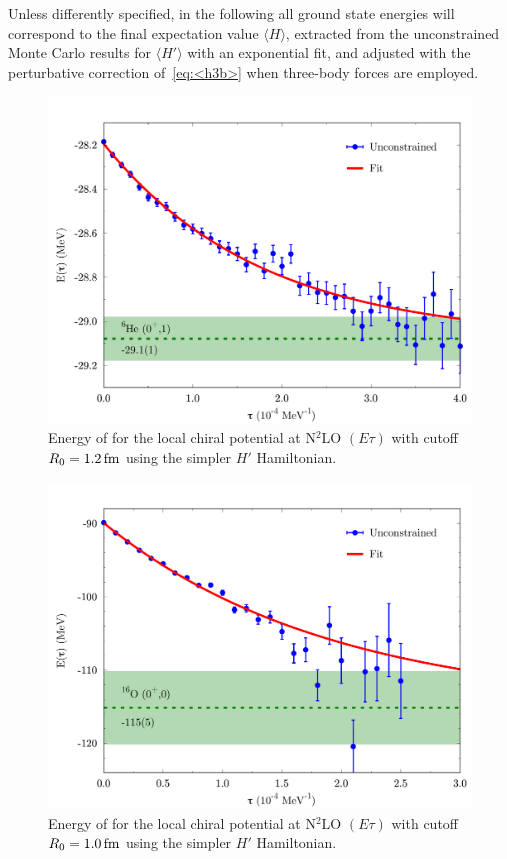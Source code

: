 \documentclass[aps,prc,twocolumn,superscriptaddress,showpacs,floatfix,nofootinbib]{revtex4-1}
\begin{document}
Unless differently specified, in the following all ground state energies will 
correspond to the final expectation value $\langle H\rangle$, extracted from 
the unconstrained Monte Carlo results for $\langle H'\rangle$ with an exponential fit, 
and adjusted with the perturbative correction of~\cref{eq:<h3b>} when three-body forces are employed.

\begin{figure}[htb]
\includegraphics[width=\linewidth]{tr_he6.pdf}
\caption[]{Energy of  for the local chiral potential at
N$^2$LO $(E\tau)$ with cutoff $R_0=1.2\,\rm fm$ using the simpler $H'$ Hamiltonian.}
\label{fig:tr_he6}
\end{figure}

\begin{figure}[htb]
\includegraphics[width=\linewidth]{tr_o16.pdf}
\caption[]{Energy of  for the local chiral potential at
N$^2$LO $(E\tau)$ with cutoff $R_0=1.0\,\rm fm$ using the simpler $H'$ Hamiltonian.}
\label{fig:tr_o16}
\end{figure}
\end{document}

